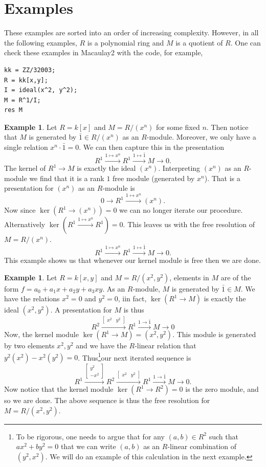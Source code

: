 \documentclass{article}
\theoremstyle{definition}
\newtheorem{example}[theorem]{Example}
\theoremstyle{remark}
\newcommand{\bmat}[1]{
    \begin{bmatrix*}
        #1
    \end{bmatrix*}
}
\begin{document}
\section{Examples}
These examples are sorted into an order of increasing complexity. However, 
in all the following examples, $R$ is a polynomial ring and $M$ is a quotient of
$R$. One can check these examples in Macaulay2 with the code, for example, 
\begin{verbatim}
kk = ZZ/32003;
R = kk[x,y];
I = ideal(x^2, y^2);
M = R^1/I;
res M
\end{verbatim}

\begin{example}
    Let $R = k[x]$ and $M = R/(x^n)$ for some fixed $n$. 
    Then notice that $M$ is generated by $\bar 1 \in R/(x^n)$ as an $R$-module. 
    Moreover, we only have a single relation $x^n \cdot \bar 1 = 0$. 
    We can then capture this in the presentation
    \[
        R^1 \xrightarrow{1 \mapsto x^n} 
        R^1 \xrightarrow{1 \mapsto \bar 1}
        M \to 0.
    \]
    The kernel of $R^1 \to M$ is exactly the ideal $(x^n)$.
    Interpreting $(x^n)$ as an $R$-module we find that it is a rank $1$ free
    module (generated by $x^n$). That is a presentation for $(x^n)$ as an
    $R$-module is 
    \[
        0 \to R^1 \xrightarrow{1 \mapsto x^n} (x^n).
    \]
    Now since $\ker(R^1 \to (x^n)) = 0$ we can no longer iterate our procedure.
    Alternatively $\ker(R^1 \xrightarrow{1 \mapsto x^n} R^1) = 0$. 
    This leaves us with the free resolution of $M = R/(x^n)$.
    \[
        R^1 \xrightarrow{1 \mapsto x^n}
        R^1 \xrightarrow{1 \mapsto \bar 1}
        M \to 0. 
    \]
    This example shows us that whenever our kernel module is free then we are
    done. 
\end{example}

\begin{example}
    Let $R = k[x,y]$ and $M = R/(x^2, y^2)$, elements in $M$ are of the form 
    $f = a_0 + a_1 x + a_2 y + a_3 xy$. As an $R$-module, $M$ is generated by
    $\bar 1 \in M$. We have the relations $x^2 = 0$ and $y^2 = 0$, iin fact, $\ker(R^1 \to M)$ is exactly the ideal $(x^2, y^2)$. 
    A presentation for $M$ is thus
    \[
        R^2 \xrightarrow{\bmat{x^2 & y^2}}
        R^1 \xrightarrow{1 \to \bar 1}
        M \to 0
    \]
    Now, the kernel module $\ker(R^1 \to M) = (x^2, y^2)$.
    This module is generated by two elements $x^2, y^2$ and we have the
    $R$-linear relation that $y^2(x^2) - x^2(y^2) = 0$. 
    Thus\footnote{
    To be rigorous, one needs to argue that for any $(a,b) \in R^2$ such that
    $ax^2 + by^2 = 0$ that we can write $(a,b)$ as an $R$-linear combination of
    $(y^2, x^2)$. We will do an example of this calculation in the next example.
    }our next iterated sequence is
    \[
        R^1 \xrightarrow{\bmat{y^2 \\ -x^2}}
        R^2 \xrightarrow{\bmat{x^2 & y^2}}
        R^1 \xrightarrow{1 \to \bar 1}
        M \to 0. 
    \]
    Now notice that the kernel module $\ker(R^1 \to R^2) = 0$ is the zero
    module, and so we are done. 
    The above sequence is thus the free resolution for $M = R/(x^2, y^2)$. 
\end{example}
\end{document}
